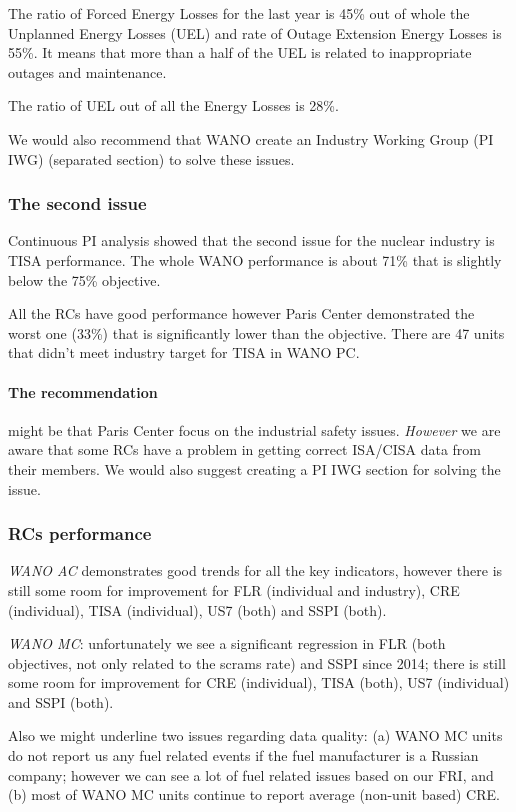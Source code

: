 The ratio of Forced Energy Losses for the last year is 45\% out of
whole the Unplanned Energy Losses (UEL) and rate
of Outage Extension Energy Losses is 55\%. It means that more than a
half of the UEL is related to inappropriate outages and maintenance.

The ratio of UEL out of all the Energy Losses is 28\%.

We would also recommend that WANO create an Industry Working Group (PI IWG)
(separated section) to solve these issues.


\subsubsection*{The second issue} 
Continuous PI analysis showed that the second issue for the nuclear
industry is TISA performance. The whole WANO performance is about 71\%
that is slightly below the 75\% objective.

All the RCs have good performance however Paris Center
demonstrated the worst one (33\%) that is significantly lower than the
objective. There are 47 units that didn't meet
industry target for TISA in WANO PC.

\paragraph{The recommendation} might be that Paris Center focus on
the industrial safety issues. \emph{However} we are aware that
some RCs have a problem in getting correct ISA/CISA data from
their members. We would also suggest creating a PI IWG section for
solving the issue.

\subsubsection*{RCs performance} 

\emph{WANO AC} demonstrates good trends
for all the key indicators, however there is still some room for
improvement for FLR (individual and industry), CRE (individual), TISA
(individual), US7 (both) and SSPI (both).

\emph{WANO MC}: unfortunately we see a significant regression
in FLR (both objectives, not only related to the scrams rate) and SSPI
since 2014;  there is still some room for
improvement for CRE (individual), TISA (both), US7 (individual) and
SSPI (both).

Also we might underline two issues regarding data quality: (a) WANO
MC units do not report us any fuel related events if the fuel
manufacturer is a Russian company; however we can see a lot of fuel
related issues based on our FRI, and (b) most of WANO MC units
continue to report average (non-unit based) CRE.

